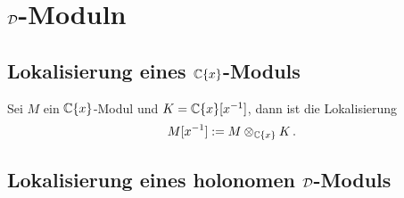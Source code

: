 
\section{$\mathcal{D}$-Moduln}

\subsection{Lokalisierung eines $\mathbb{C}\{x\}$-Moduls}

\begin{defn}
  Sei $M$ ein $\mathbb{C}\{x\}$-Modul und $K=\mathbb{C}\{x\}[x^{-1}]$, dann ist die
  Lokalisierung
  \[ M[x^{-1}]:=M\otimes_{\mathbb{C}\{x\}}K \,. \]
\end{defn}

\subsection{Lokalisierung eines holonomen $\mathcal{D}$-Moduls}

